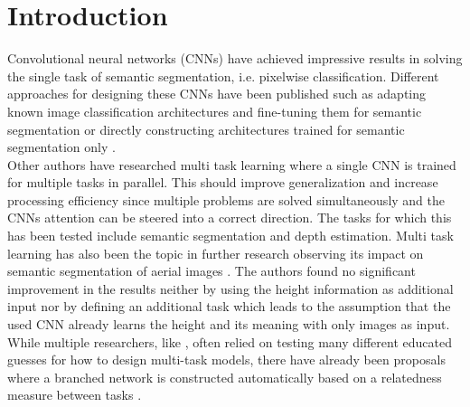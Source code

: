 \section{Introduction}

Convolutional neural networks (CNNs) have achieved impressive results in solving the single
task of semantic segmentation, 
i.e. pixelwise classification. 
Different approaches for designing these CNNs have been published such as adapting known image classification
architectures and fine-tuning them for semantic segmentation \parencite{2017-shelhamer-fully} or directly
constructing architectures trained for semantic segmentation only \parencite{2016-jegou-the}.\\

Other authors have researched multi task learning \parencite{2018-kendall-multi} where a single CNN is trained
for multiple tasks in parallel. This should improve generalization and increase processing efficiency since multiple
problems are solved simultaneously and the CNNs attention can be steered into a correct direction.
The tasks for which this has been tested include semantic segmentation and depth estimation.
Multi task learning has also been the topic in further research observing its impact
on semantic segmentation of aerial images \parencite{2019-schmitz-semantic}. The authors found
no significant improvement in the results neither by using the height information as additional input nor by defining
an additional task which leads to the assumption that the used CNN already learns the height and its meaning with only
images as input. \\




While multiple researchers, like \textcite{2019-schmitz-semantic}, often relied on testing many different educated 
guesses for
how to design multi-task models, there have already been proposals where a branched network
is constructed automatically based on a relatedness measure between tasks \parencite{2019-vandenhende-branched}.\\

